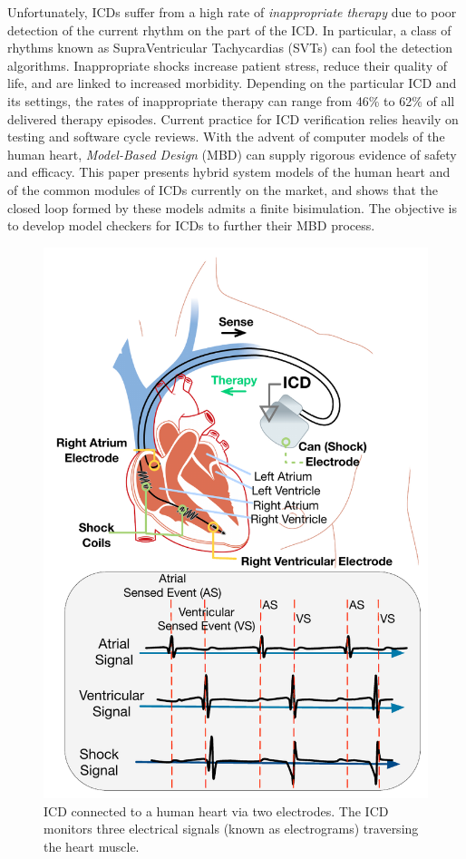 Unfortunately, \acp{ICD} suffer from a high rate of \emph{inappropriate therapy} due to poor detection of the current rhythm on the part of the \ac{ICD}.
In particular, a class of rhythms known as SupraVentricular Tachycardias (SVTs) can fool the detection algorithms.
Inappropriate shocks increase patient stress, reduce their quality of life, and are linked to increased morbidity.
Depending on the particular ICD and its settings, the rates of inappropriate therapy can range from 46\% to 62\% of all delivered therapy episodes.
Current practice for \ac{ICD} verification relies heavily on testing and software cycle reviews.
With the advent of computer models of the human heart, \emph{Model-Based Design} (MBD) can supply rigorous evidence of safety and efficacy. 
This paper presents hybrid system models of the human heart and of the common modules of \acp{ICD} currently on the market, and shows that the closed loop formed by these models admits a finite bisimulation.
The objective is to develop model checkers for \acp{ICD} to further their MBD process.
\begin{figure}[t]
	\centering
	\includegraphics[scale=0.3]{figures/figICD}
	\vspace{-10pt}
	\caption{\small ICD connected to a human heart via two electrodes. The ICD monitors three electrical signals (known as electrograms) traversing the heart muscle.}
	\label{fig:icd}
	\vspace{-10pt}
\end{figure}

